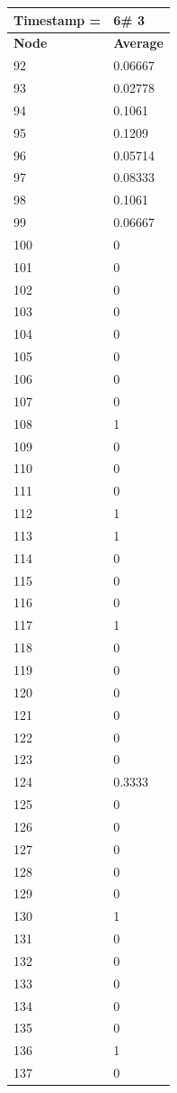 \begin{tabular}{|l||l|}
\hline
\textbf{Timestamp =} & \textbf{6}\# 3\\\hline
	\textbf{Node} & \textbf{Average} \\ \hline
\hline
	92 & 0.06667 \\ \hline
	93 & 0.02778 \\ \hline
	94 & 0.1061 \\ \hline
	95 & 0.1209 \\ \hline
	96 & 0.05714 \\ \hline
	97 & 0.08333 \\ \hline
	98 & 0.1061 \\ \hline
	99 & 0.06667 \\ \hline
	100 & 0 \\ \hline
	101 & 0 \\ \hline
	102 & 0 \\ \hline
	103 & 0 \\ \hline
	104 & 0 \\ \hline
	105 & 0 \\ \hline
	106 & 0 \\ \hline
	107 & 0 \\ \hline
	108 & 1 \\ \hline
	109 & 0 \\ \hline
	110 & 0 \\ \hline
	111 & 0 \\ \hline
	112 & 1 \\ \hline
	113 & 1 \\ \hline
	114 & 0 \\ \hline
	115 & 0 \\ \hline
	116 & 0 \\ \hline
	117 & 1 \\ \hline
	118 & 0 \\ \hline
	119 & 0 \\ \hline
	120 & 0 \\ \hline
	121 & 0 \\ \hline
	122 & 0 \\ \hline
	123 & 0 \\ \hline
	124 & 0.3333 \\ \hline
	125 & 0 \\ \hline
	126 & 0 \\ \hline
	127 & 0 \\ \hline
	128 & 0 \\ \hline
	129 & 0 \\ \hline
	130 & 1 \\ \hline
	131 & 0 \\ \hline
	132 & 0 \\ \hline
	133 & 0 \\ \hline
	134 & 0 \\ \hline
	135 & 0 \\ \hline
	136 & 1 \\ \hline
	137 & 0 \\ \hline
\end{tabular}

